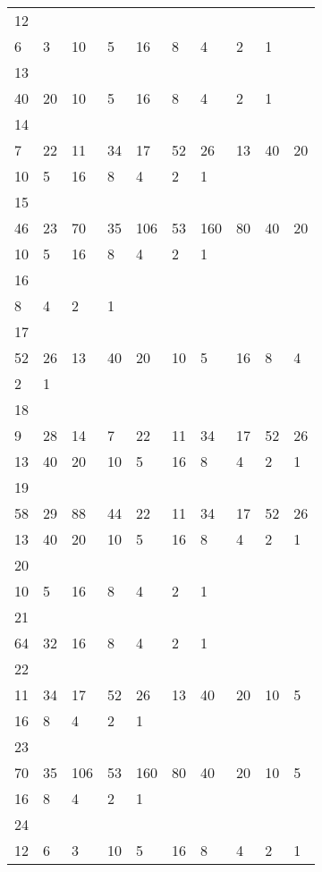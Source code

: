 \begin{longtable}{*{10}{l}}
12&&&&&&&&&\\
6& 3& 10& 5& 16& 8& 4& 2& 1& \\

13&&&&&&&&&\\
40& 20& 10& 5& 16& 8& 4& 2& 1& \\

14&&&&&&&&&\\
7& 22& 11& 34& 17& 52& 26& 13& 40& 20\\
10& 5& 16& 8& 4& 2& 1& \\

15&&&&&&&&&\\
46& 23& 70& 35& 106& 53& 160& 80& 40& 20\\
10& 5& 16& 8& 4& 2& 1& \\

16&&&&&&&&&\\
8& 4& 2& 1& \\

17&&&&&&&&&\\
52& 26& 13& 40& 20& 10& 5& 16& 8& 4\\
2& 1& \\

18&&&&&&&&&\\
9& 28& 14& 7& 22& 11& 34& 17& 52& 26\\
13& 40& 20& 10& 5& 16& 8& 4& 2& 1\\

19&&&&&&&&&\\
58& 29& 88& 44& 22& 11& 34& 17& 52& 26\\
13& 40& 20& 10& 5& 16& 8& 4& 2& 1\\

20&&&&&&&&&\\
10& 5& 16& 8& 4& 2& 1& \\

21&&&&&&&&&\\
64& 32& 16& 8& 4& 2& 1& \\

22&&&&&&&&&\\
11& 34& 17& 52& 26& 13& 40& 20& 10& 5\\
16& 8& 4& 2& 1& \\

23&&&&&&&&&\\
70& 35& 106& 53& 160& 80& 40& 20& 10& 5\\
16& 8& 4& 2& 1& \\

24&&&&&&&&&\\
12& 6& 3& 10& 5& 16& 8& 4& 2& 1\\


\end{longtable}
